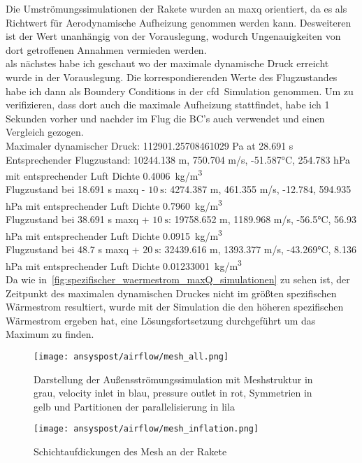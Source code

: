 Die Umströmungssimulationen der Rakete wurden an \ac{maxq} orientiert, da es als Richtwert für Aerodynamische Aufheizung genommen werden kann.
Desweiteren ist der Wert unanhängig von der Vorauslegung, wodurch Ungenauigkeiten von dort getroffenen Annahmen vermieden werden.\\


als nächstes habe ich geschaut wo der maximale dynamische Druck erreicht wurde in der Vorauslegung. Die korrespondierenden Werte des Flugzustandes
habe ich dann als Boundery Conditions in der \ac{cfd}~Simulation genommen.
Um zu verifizieren, dass dort auch die maximale Aufheizung stattfindet, habe ich 1 Sekunden vorher und nachder
im Flug die BC's auch verwendet und einen Vergleich gezogen.\\
Maximaler dynamischer Druck: 112901.25708461029 Pa at 28.691 s\\
Entsprechender Flugzustand: 10244.138 m, 750.704 m/s, -51.587°C, 254.783 hPa mit entsprechender Luft Dichte \SI{0.4006}{kg/m^3}\\
Flugzustand bei 18.691 s \ac{maxq} - $\SI{10}{\second}$: 4274.387 m, 461.355 m/s, -12.784, 594.935 hPa mit entsprechender Luft Dichte \SI{0.7960}{kg/m^3}\\
Flugzustand bei 38.691 s \ac{maxq} + $\SI{10}{\second}$: 19758.652 m, 1189.968 m/s, -56.5°C, 56.93 hPa mit entsprechender Luft Dichte \SI{0.0915}{kg/m^3}\\
Flugzustand bei 48.7 s \ac{maxq} + $\SI{20}{\second}$: 32439.616 m, 1393.377 m/s, -43.269°C, 8.136 hPa mit entsprechender Luft Dichte \SI{0.01233001}{kg/m^3}\\
Da wie in~\ref{fig:spezifischer_waermestrom_maxQ_simulationen} zu sehen ist, der Zeitpunkt des maximalen dynamischen Druckes nicht im größten spezifischen
Wärmestrom resultiert, wurde mit der Simulation die den höheren spezifischen Wärmestrom ergeben hat, eine Lösungsfortsetzung durchgeführt um das Maximum zu finden.\\

\begin{figure}[H]
  \centering
  \texttt{[image: ansyspost/airflow/mesh\_all.png]}
  \caption{Darstellung der Außensströmungssimulation mit Meshstruktur in grau, velocity inlet in blau, pressure outlet in rot, Symmetrien in gelb und Partitionen der parallelisierung in lila}\label{fig:aussenstroemung_mesh}
\end{figure}

\begin{figure}[H]
  \centering
  \texttt{[image: ansyspost/airflow/mesh\_inflation.png]}
  \caption{Schichtaufdickungen des Mesh an der Rakete}\label{fig:aussenstroemung_mesh_inflationlayers}
\end{figure}

